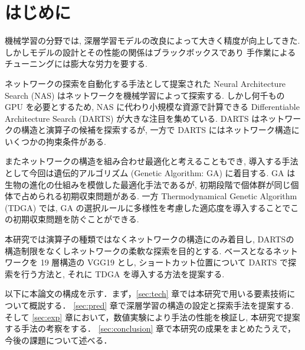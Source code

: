 \newpage
\changeindent{0cm}
\section{はじめに}
\label{sec:intro}
\changeindent{2cm}

機械学習の分野では, 深層学習モデルの改良によって大きく精度が向上してきた.
しかしモデルの設計とその性能の関係はブラックボックスであり
手作業によるチューニングには膨大な労力を要する.

ネットワークの探索を自動化する手法として提案された
Neural Architecture Search (NAS) はネットワークを機械学習によって探索する.
しかし何千もの GPU を必要とするため, NAS に代わり小規模な資源で計算できる
Differentiable Architecture Search (DARTS) が大きな注目を集めている.
DARTS はネットワークの構造と演算子の候補を探索するが,
一方で DARTS にはネットワーク構造にいくつかの拘束条件がある.

またネットワークの構造を組み合わせ最適化と考えることもでき,
導入する手法として今回は遺伝的アルゴリズム (Genetic Algorithm: GA) に着目する.
GA は生物の進化の仕組みを模倣した最適化手法であるが,
初期段階で個体群が同じ個体で占められる初期収束問題がある.
一方 Thermodynamical Genetic Algorithm (TDGA) では,
GA の選択ルールに多様性を考慮した適応度を導入することでこの初期収束問題を防ぐことができる.


本研究では演算子の種類ではなくネットワークの構造にのみ着目し,
DARTSの構造制限をなくしネットワークの柔軟な探索を目的とする.
ベースとなるネットワークを 19 層構造の VGG19 とし,
ショートカット位置について DARTS で探索を行う方法と, それに TDGA を導入する方法を提案する.


以下に本論文の構成を示す．まず，\ref{sec:tech} 章では本研究で用いる要素技術について概説する．
\ref{sec:pred} 章で深層学習の構造の設定と探索手法を提案する.
そして \ref{sec:exp} 章において，数値実験により手法の性能を検証し, 本研究で提案する手法の考察をする．
\ref{sec:conclusion} 章で本研究の成果をまとめたうえで，今後の課題について述べる．


\begin{comment}
\end{comment}

